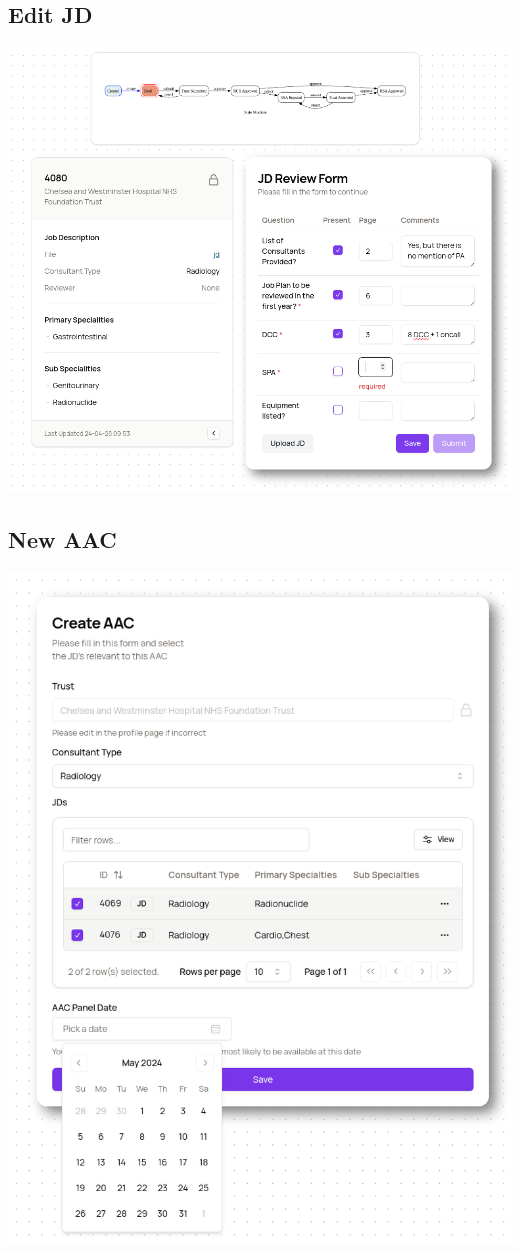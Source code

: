 \begin{appendices}
\subsection{Edit JD} \label{app:EditJD}
\includegraphics[width=\textwidth]{images/jd-form.png}

\subsection{New AAC} \label{app:NewAAC}
\includegraphics[width=\textwidth]{images/aac-form.png}


\end{appendices}
